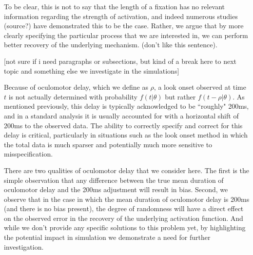 To be clear, this is not to say that the length of a fixation has no relevant information regarding the strength of activation, and indeed numerous studies (source?) have demonstrated this to be the case. Rather, we argue that by more clearly specifying the particular process that we are interested in, we can perform better recovery of the underlying mechanism. (don't like this sentence).

[not sure if i need paragraphs or subsections, but kind of a break here to next topic and something else we investigate in the simulations]

Because of oculomotor delay, which we define as $\rho$, a look onset observed at time $t$ is not actually determined with probability $f(t|\theta)$ but rather $f(t - \rho|\theta)$. As mentioned previously, this delay is typically acknowledged to be ``roughly" 200ms, and in a standard analysis it is usually accounted for with a horizontal shift of 200ms to the observed data. The ability to correctly specify and correct for this delay is critical, particularly in situations such as the look onset method in which the total data is much sparser and potentially much more sensitive to misspecification. 

There are two qualities of oculomotor delay that we consider here. The first is the simple observation that any difference between the true mean duration of oculomotor delay and the 200ms adjustment will result in bias. Second, we observe that in the case in which the mean duration of oculomotor delay is 200ms (and there is no bias present), the degree of randomness will have a direct effect on the observed error in the recovery of the underlying activation function. And while we don't provide any specific solutions to this problem yet, by highlighting the potential impact in simulation we demonstrate a need for further investigation.





